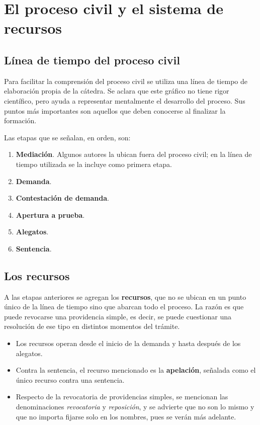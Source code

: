 \documentclass[12pt,oneside]{book}
\begin{document}
\chapter[El proceso civil y los recursos]{El proceso civil y el sistema de recursos}

\section{Línea de tiempo del proceso civil}

Para facilitar la comprensión del proceso civil se utiliza una línea de tiempo de elaboración propia de la cátedra. Se aclara que este gráfico no tiene rigor científico, pero ayuda a representar mentalmente el desarrollo del proceso. Sus puntos más importantes son aquellos que deben conocerse al finalizar la formación.

Las etapas que se señalan, en orden, son:

\begin{enumerate}
    \item \textbf{Mediación}. Algunos autores la ubican fuera del proceso civil; en la línea de tiempo utilizada se la incluye como primera etapa.
    \item \textbf{Demanda}.
    \item \textbf{Contestación de demanda}.
    \item \textbf{Apertura a prueba}.
    \item \textbf{Alegatos}.
    \item \textbf{Sentencia}.
\end{enumerate}

\section{Los recursos}

A las etapas anteriores se agregan los \textbf{recursos}, que no se ubican en un punto único de la línea de tiempo sino que abarcan todo el proceso. La razón es que puede revocarse una providencia simple, es decir, se puede cuestionar una resolución de ese tipo en distintos momentos del trámite.

\begin{itemize}
    \item Los recursos operan desde el inicio de la demanda y hasta después de los alegatos.
    \item Contra la sentencia, el recurso mencionado es la \textbf{apelación}, señalada como el único recurso contra una sentencia.
    \item Respecto de la revocatoria de providencias simples, se mencionan las denominaciones \emph{revocatoria} y \emph{reposición}, y se advierte que no son lo mismo y que no importa fijarse solo en los nombres, pues se verán más adelante.
\end{itemize}
\end{document}
